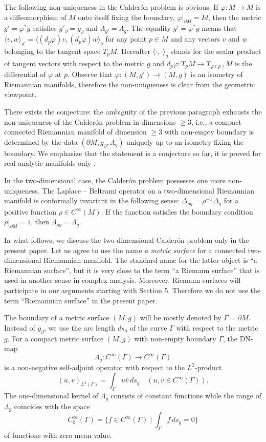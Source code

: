 \documentclass[12pt,reqno]{amsart}
\begin{document}
The following non-uniqueness in the Calder\'{o}n problem is obvious. If $\varphi:M\rightarrow M$ is a diffeomorphism of $M$ onto itself fixing the boundary, $\varphi|_{\partial M}=Id$, then the metric $g'=\varphi^*g$ satisfies $g'_{\!\partial}=g_{\partial}$ and $\Lambda_{g'}=\Lambda_g$. The equality $g'=\varphi^*g$ means that
$\langle v,w\rangle_{g'}=\langle (d_p\varphi)v,(d_p\varphi)w\rangle_{g}$
for any point $p\in M$ and any vectors $v$ and $w$ belonging to the tangent space $T_pM$. Hereafter $\langle \cdot,\cdot\rangle_{g}$ stands for the scalar product of tangent vectors with respect to the metric $g$ and $d_p\varphi:T_pM\rightarrow T_{\varphi(p)}M$ is the differential of  $\varphi$ at $p$. Observe that $\varphi:(M,g')\rightarrow (M,g)$ is an isometry of Riemannian manifolds, therefore the non-uniqueness is clear from the geometric viewpoint.

There exists the conjecture: the ambiguity of the previous paragraph exhausts the non-uniqueness of the Calder\'{o}n problem in dimensions
$\geq 3$, i.e., a compact connected Riemannian manifold of dimension $\geq 3$ with non-empty boundary is determined by the data
$(\partial M,g_\partial,\Lambda_g)$ uniquely up to an isometry fixing the boundary. We emphasize that the statement is a conjecture so far, it is proved for real analytic manifolds only \cite{LaU}.

In the two-dimensional case, the Calder\'{o}n problem possesses one more non-uniqueness. The Laplace -- Beltrami operator on a two-dimensional Riemannian manifold is conformally invariant in the following sense: $\Delta_{\rho g}=\rho^{-1}\Delta_g$ for a positive function
$\rho\in C^\infty(M)$. If the function satisfies the boundary condition $\rho|_{\partial M}=1$, then $\Lambda_{\rho g}=\Lambda_g$.

In what follows, we discuss the two-dimensional Calder\'{o}n problem only in the present paper. Let us agree to use the name {\it a metric surface} for a connected two-dimensional Riemannian manifold. The standard name for the latter object is ``a Riemannian surface'', but it is very close to the term ``a Riemann surface'' that is used in another sense in complex analysis. Moreover, Riemann surfaces will participate in our arguments starting with Section 5. Therefore we do not use the term ``Riemannian surface'' in the present paper.

The boundary of a metric surface $(M,g)$ will be mostly denoted by $\Gamma=\partial M$. Instead of $g_\partial$, we use the arc length $ds_g$ of the curve $\Gamma$ with respect to the metric $g$. For a compact metric surface $(M,g)$ with non-empty boundary $\Gamma$, the DN-map
$$
\Lambda_g:C^\infty(\Gamma)\to C^\infty(\Gamma)
$$
is a non-negative self-adjoint operator with respect to the $L^2$-product
$$
(u,v)_{L^2(\Gamma)}=\int_\Gamma u\overline v\,ds_g\quad(u,v\in C^\infty(\Gamma)).
$$
The one-dimensional kernel of $\Lambda_g$ consists of constant functions while the range of $\Lambda_g$ coincides with the space
$$
C_0^\infty(\Gamma)=\Big\{f\in C^\infty(\Gamma)\mid\int_\Gamma f\,ds_g=0\Big\}
$$
of functions with zero mean value.
\end{document}
